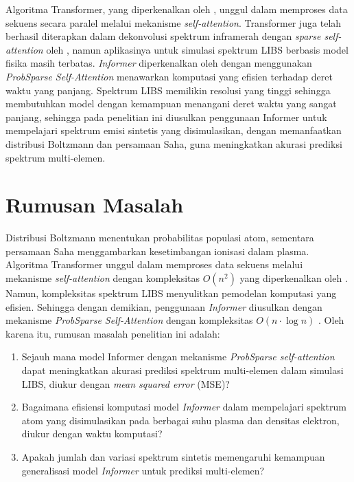 \par Algoritma Transformer, yang diperkenalkan oleh \cite{Vaswani2017}, unggul dalam memproses data sekuens secara paralel melalui mekanisme \textit{self-attention}. Transformer juga telah berhasil diterapkan dalam dekonvolusi spektrum inframerah dengan \textit{sparse self-attention} oleh \cite{Gao2024}, namun aplikasinya untuk simulasi spektrum LIBS berbasis model fisika masih terbatas. \textit{Informer} diperkenalkan oleh \cite{Zhou2021} dengan menggunakan \textit{ProbSparse Self-Attention} menawarkan komputasi yang efisien terhadap deret waktu yang panjang. Spektrum LIBS memilikin resolusi yang tinggi sehingga membutuhkan model dengan kemampuan menangani deret waktu yang sangat panjang, sehingga pada penelitian ini diusulkan penggunaan Informer untuk mempelajari spektrum emisi sintetis yang disimulasikan, dengan memanfaatkan distribusi Boltzmann dan persamaan Saha, guna meningkatkan akurasi prediksi spektrum multi-elemen.


\section{Rumusan Masalah}
\par Distribusi Boltzmann menentukan probabilitas populasi atom, sementara persamaan Saha menggambarkan kesetimbangan ionisasi dalam plasma. Algoritma Transformer unggul dalam memproses data sekuens melalui mekanisme \textit{self-attention} dengan kompleksitas \( O(n ^2) \)  yang diperkenalkan oleh \cite{Vaswani2017}. Namun, kompleksitas spektrum LIBS menyulitkan pemodelan komputasi yang efisien.  Sehingga dengan demikian, penggunaan \textit{Informer} diusulkan dengan mekanisme \textit{ProbSparse Self-Attention} dengan kompleksitas \( O(n \cdot \log n) \) \parencite{Gao2024}. Oleh karena itu, rumusan masalah penelitian ini adalah:
\begin{enumerate}
    \item Sejauh mana model Informer dengan mekanisme \textit{ProbSparse self-attention} dapat meningkatkan akurasi prediksi spektrum multi-elemen  dalam simulasi LIBS, diukur dengan \textit{mean squared error} (MSE)?
    \item Bagaimana efisiensi komputasi model \textit{Informer} dalam mempelajari spektrum atom yang disimulasikan pada berbagai suhu plasma dan densitas elektron, diukur dengan waktu komputasi?
    \item Apakah jumlah dan variasi spektrum sintetis memengaruhi kemampuan generalisasi model \textit{Informer} untuk prediksi multi-elemen?
\end{enumerate}


